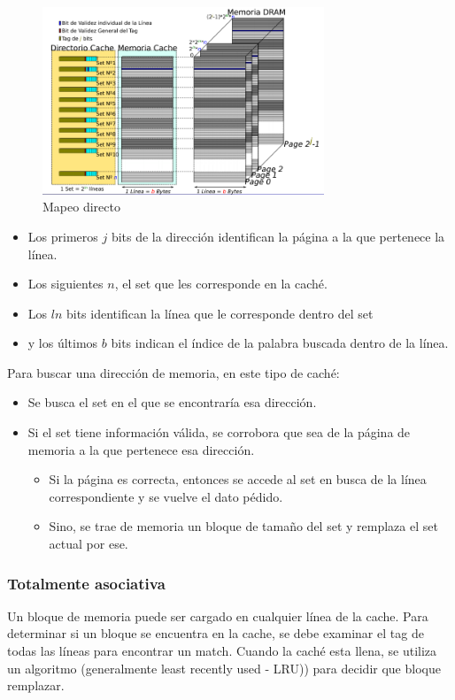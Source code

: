 \begin{figure}[ht]
	\centering
	\includegraphics[width=0.75\textwidth]{imagenes/cache-mapeo-directo}
	\caption{Mapeo directo}
	\label{fig:direct-mapping}
\end{figure}
\begin{itemize}
	\item Los primeros $j$ bits de la dirección identifican la página a la que pertenece la línea.
	\item Los siguientes $n$, el set que les corresponde en la caché.
	\item Los $ln$ bits identifican la línea que le corresponde dentro del set
	\item y los últimos $b$ bits indican el índice de la palabra buscada dentro de la línea.
\end{itemize}

Para  buscar una dirección de memoria, en este tipo de caché:

\begin{itemize}
	\item Se busca el set en el que se encontraría esa dirección.
	\item Si el set tiene información válida, se corrobora que sea de la página de memoria a la que pertenece esa dirección.
	\begin{itemize}
		\item Si la página es correcta, entonces se accede al set en busca de la línea correspondiente y se vuelve el dato pédido.
		\item Sino, se trae de memoria un bloque de tamaño del set y remplaza el set actual por ese.
	\end{itemize}
\end{itemize}

\subsubsection{Totalmente asociativa}
Un bloque de memoria puede ser cargado en cualquier línea de la cache. Para determinar si un bloque se encuentra en la cache, se debe examinar el tag de todas las líneas para encontrar un match. Cuando la caché esta llena, se utiliza un algoritmo (generalmente least recently used - LRU)) para decidir que bloque remplazar.


